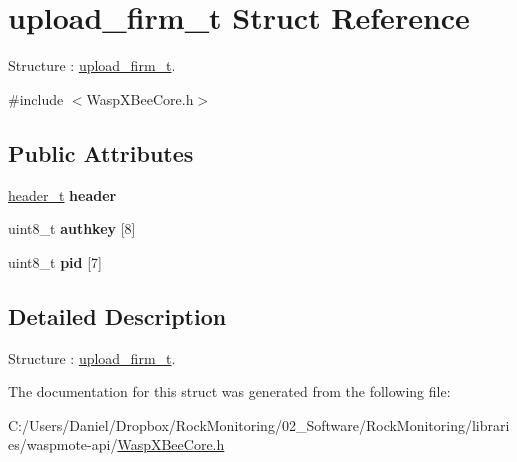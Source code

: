 \hypertarget{structupload__firm__t}{}\section{upload\+\_\+firm\+\_\+t Struct Reference}
\label{structupload__firm__t}


Structure \+: \hyperlink{structupload__firm__t}{upload\+\_\+firm\+\_\+t}.  




{\ttfamily \#include $<$Wasp\+X\+Bee\+Core.\+h$>$}

\subsection*{Public Attributes}
\begin{DoxyCompactItemize}
\item 
\hyperlink{structheader__t}{header\+\_\+t} {\bfseries header}\hypertarget{structupload__firm__t_af574453d1c2d42b70029e6829f8031d3}{}\label{structupload__firm__t_af574453d1c2d42b70029e6829f8031d3}

\item 
uint8\+\_\+t {\bfseries authkey} \mbox{[}8\mbox{]}\hypertarget{structupload__firm__t_a2dc424916fc365d34aba5bb09842865a}{}\label{structupload__firm__t_a2dc424916fc365d34aba5bb09842865a}

\item 
uint8\+\_\+t {\bfseries pid} \mbox{[}7\mbox{]}\hypertarget{structupload__firm__t_ae94da762281d3c0852e3e535c400b5b6}{}\label{structupload__firm__t_ae94da762281d3c0852e3e535c400b5b6}

\end{DoxyCompactItemize}


\subsection{Detailed Description}
Structure \+: \hyperlink{structupload__firm__t}{upload\+\_\+firm\+\_\+t}. 

The documentation for this struct was generated from the following file\+:\begin{DoxyCompactItemize}
\item 
C\+:/\+Users/\+Daniel/\+Dropbox/\+Rock\+Monitoring/02\+\_\+\+Software/\+Rock\+Monitoring/libraries/waspmote-\/api/\hyperlink{_wasp_x_bee_core_8h}{Wasp\+X\+Bee\+Core.\+h}\end{DoxyCompactItemize}
